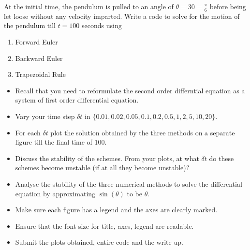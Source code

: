 \documentclass{article}
\begin{document}
\begin{enumerate}
                At the initial time, the pendulum is pulled to an angle of $\theta = 30 =
                \frac{\pi}{6}$ before being let loose without any velocity imparted. Write
                a code to solve for the motion of the pendulum till $t = 100$ seconds
                using

                    \begin{enumerate}
                        \item Forward Euler
                        \item Backward Euler
                        \item Trapezoidal Rule
                    \end{enumerate}


                    \begin{itemize}
                        \item Recall that you need to reformulate the second order
                        differntial equation as a system of first order differential
                        equation.
                        \item Vary your time step $\delta t$ in $\{0.01, 0.02, 0.05, 0.1,
                        0.2, 0.5, 1, 2, 5, 10, 20\}$.
                        \item For each $\delta t$ plot the solution obtained by the three
                        methods on a separate figure till the final time of 100.
                        \item Discuss the stability of the schemes. From your plots, at
                        what $\delta t$ do these schemes become unstable (if at all they
                        become unstable)?
                        \item Analyse the stability of the three numerical methods to
                        solve the differential equation by approximating $\sin(\theta)$
                        to be $\theta$.
                        \item Make sure each figure has a legend and the axes are clearly
                        marked.
                        \item Ensure that the font size for title, axes, legend are
                        readable.
                        \item Submit the plots obtained, entire code and the write-up.
                    \end{itemize}

	\end{enumerate}
\end{document}
